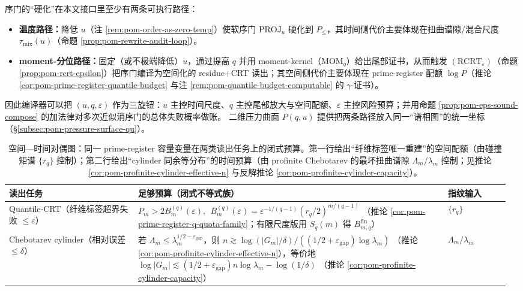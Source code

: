 \begin{remark}\label{rem:pom-hardening-u-vs-q}
序门的“硬化”在本文接口里至少有两条可执行路径：
\begin{itemize}
  \item \textbf{温度路径：}降低 \(u\)（注 \ref{rem:pom-order-as-zero-temp}）使软序门 \(\mathrm{PROJ}_u\) 硬化到 \(P_{\le}\)，其时间侧代价主要体现在扭曲谱隙/混合尺度 \(\tau_{\mathrm{mix}}(u)\)（命题 \ref{prop:pom-rewrite-audit-loop}）。
  \item \textbf{moment-分位路径：}固定（或不极端降低）\(u\)，通过提高 \(q\) 并用 moment-kernel（\(\mathrm{MOM}_q\)）给出尾部证书，从而触发 \((\mathrm{RCRT}_\varepsilon)\)（命题 \ref{prop:pom-rcrt-epsilon}）把序门编译为空间化的 residue+CRT 读出；其空间侧代价主要体现在 prime-register 配额 \(\log P\)（推论 \ref{cor:pom-prime-register-quantile-budget} 与注 \ref{rem:pom-quantile-budget-computable} 的 \(\gamma\)-证书）。
\end{itemize}
因此编译器可以把 \((u,q,\varepsilon)\) 作为三旋钮：\(u\) 主控时间尺度、\(q\) 主控尾部放大与空间配额、\(\varepsilon\) 主控风险预算；并用命题 \ref{prop:pom-eps-sound-compose} 的加法律对多次近似消序门的总体失败概率做账。
二维压力曲面 \(P(q,u)\) 提供把两条路径放入同一“谱相图”的统一坐标（\S\ref{subsec:pom-pressure-surface-qu}）。
\end{remark}

\begin{table}[H]
\centering
\scriptsize
\setlength{\tabcolsep}{6pt}
\caption{空间—时间对偶图：同一 prime-register 容量变量在两类读出任务上的闭式预算。第一行给出“纤维标签唯一重建”的空间配额（由碰撞矩谱 \(\{r_q\}\) 控制）；第二行给出“cylinder 同余等分布”的时间预算（由 profinite Chebotarev 的最坏扭曲谱隙 \(\Lambda_m/\lambda_m\) 控制；见推论 \ref{cor:pom-profinite-cylinder-effective-n} 与反解推论 \ref{cor:pom-profinite-cylinder-capacity}）。}
\label{tab:pom-space-time-duality-prime-register}
\begin{tabular}{p{0.25\linewidth} p{0.60\linewidth} p{0.12\linewidth}}
\toprule
读出任务 & 足够预算（闭式不等式族） & 指纹输入\\
\midrule
Quantile-CRT（纤维标签超界失败 \(\le\varepsilon\)） &
\(
P_m>2B_m^{(q)}(\varepsilon),
\ \ 
B_m^{(q)}(\varepsilon)=\varepsilon^{-1/(q-1)}(r_q/2)^{m/(q-1)}
\)
（推论 \ref{cor:pom-prime-register-q-quota-family}；有限尺度版用 \(S_q(m)\) 得 \(B_{m,q}^{\mathrm{fin}}\)） &
\(\{r_q\}\)\\

Chebotarev cylinder（相对误差 \(\le\delta\)） &
若 \(\Lambda_m\le \lambda_m^{1/2-\varepsilon_{\mathrm{gap}}}\)，则
\(
n\gtrsim \log(|G_m|/\delta)/((1/2+\varepsilon_{\mathrm{gap}})\log\lambda_m)
\)
（推论 \ref{cor:pom-profinite-cylinder-effective-n}），等价地
\(
\log|G_m|\lesssim (1/2+\varepsilon_{\mathrm{gap}})n\log\lambda_m-\log(1/\delta)
\)
（推论 \ref{cor:pom-profinite-cylinder-capacity}） &
\(\Lambda_m/\lambda_m\)\\
\bottomrule
\end{tabular}
\end{table}

